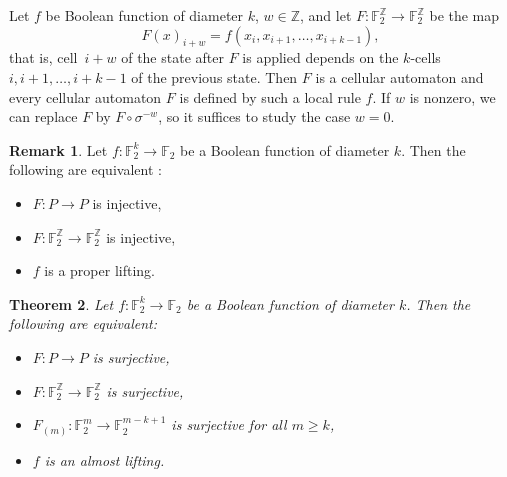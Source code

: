 \documentclass[11pt,english,a4paper]{amsart}
\theoremstyle{plain}
\newtheorem{theorem}{Theorem}[section]
\theoremstyle{definition}
\newtheorem{remark}[theorem]{Remark}
\theoremstyle{remark}
\newcommand{\Z}{\mathbb{Z}}
\newcommand{\F}{\mathbb{F}}
\begin{document}
	Let $f$ be Boolean function of diameter $k$, $w\in\Z$, and let $F\colon\F_2^\Z\to\F_2^\Z$ be the map %
	\[
	F(x)_{i+w} = f(x_i,x_{i+1},\dotsc,x_{i+k-1}),
	\]
	that is, cell~$i+w$ of the state after $F$ is applied depends on the $k$-cells $i,i+1,\dotsc,i+k-1$ of the previous state. Then $F$ is a cellular automaton and every cellular automaton $F$ is defined by such a local rule $f$. If $w$ is nonzero, we can replace $F$ by $F\circ \sigma^{-w}$, so it suffices to study the case $w=0$.

\begin{remark}
    	Let $f\colon\F_2^k \to \F_2$ be a Boolean function of diameter $k$.
		Then the following are equivalent \cite[Theorem~7]{kari-survey}:
		\begin{itemize}
            \item[(i)] $F\colon P\to P$ is injective,
			\item[(ii)] $F\colon \F_2^\Z\to \F_2^\Z$ is injective,
   			\item[(iii)] $f$ is a proper lifting.
		\end{itemize}
\end{remark}
 
	\begin{theorem}
		Let $f\colon\F_2^k \to \F_2$ be a Boolean function of diameter $k$.
		Then the following are equivalent:
		\begin{itemize}
			\item[(i)] $F\colon P\to P$ is surjective,
			\item[(ii)] $F\colon \F_2^\Z\to \F_2^\Z$ is surjective,
			\item[(iii)] $F_{(m)}\colon \F_2^m\to \F_2^{m-k+1}$ is surjective for all $m\geq k$,
			\item[(iv)] $f$ is an almost lifting.
		\end{itemize}
	\end{theorem}
	
\end{document}
